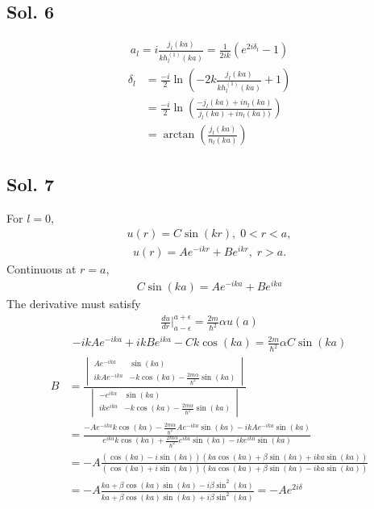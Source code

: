 \subsection*{Sol. 6}
\begin{align*}
    a_l = i\frac{j_l(ka)}{kh_l^{(1)}(ka)} = \frac{1}{2ik}(e^{2i\delta_l}-1)
\end{align*}
\begin{align*}
    \delta_l & =\frac{-i}{2}\ln(-2k\frac{j_l(ka)}{kh_l^{(1)}(ka)}+1) \\
             & =
    \frac{-i}{2}\ln(\frac{-j_l(ka)+in_l(ka)}{j_l(ka)+in_l(ka))}) \\
             & =\arctan(\frac{j_l(ka)}{n_l(ka)})
\end{align*}
\subsection*{Sol. 7}
For $l=0$,
\begin{align*}
    u(r) = C\sin(kr), \; 0<r<a,
\end{align*}
\begin{align*}
    u(r) =  Ae^{-ikr}+ Be^{ikr}, \; r>a.
\end{align*}
Continuous at $r=a$,
\begin{align*}
    C\sin(ka) = Ae^{-ika}+ Be^{ika}
\end{align*}
The derivative must satisfy
\begin{align*}
    \frac{du}{dr}\bigg|^{a+\epsilon}_{a-\epsilon}
    =\frac{2m}{\hbar^2}\alpha u(a)
\end{align*}
\begin{align*}
    -ikAe^{-ika} + ikBe^{ika} - Ck\cos(ka) = \frac{2m}{\hbar^2}\alpha C\sin(ka)
\end{align*}
\begin{align*}
    B & = \frac{{\begin{vmatrix}
                      Ae^{-ika}   & \sin(ka)                                    \\
                      ikAe^{-ika} & -k\cos(ka)-\frac{2m\alpha}{\hbar^2}\sin(ka)
                  \end{vmatrix}}}
          {\begin{vmatrix}
                  -e^{ika}  & \sin(ka)                                    \\
                  ike^{ika} & -k\cos(ka)-\frac{2m\alpha}{\hbar^2}\sin(ka)
              \end{vmatrix}} \\
      & =\frac{-Ae^{-ika}k\cos(ka)-\frac{2m\alpha}{\hbar^2}Ae^{-ika}\sin(ka)-ikAe^{-ika}\sin(ka)}
         {e^{ika}k\cos(ka)+\frac{2m\alpha}{\hbar^2}e^{ika}\sin(ka)-ike^{ika}\sin(ka)} \\
      & =-A
    \frac{(\cos(ka)-i\sin(ka))(ka\cos(ka)+\beta \sin(ka)+ika\sin(ka))}
    {(\cos(ka)+i\sin(ka))(ka\cos(ka)+\beta \sin(ka)-ika\sin(ka))} \\
      & =-A
    \frac{ka+\beta \cos(ka)\sin(ka)
        -i\beta\sin^2(ka)}
    {ka+\beta \cos(ka)\sin(ka)
        +i\beta\sin^2(ka)}=-Ae^{2i\delta}
\end{align*}

